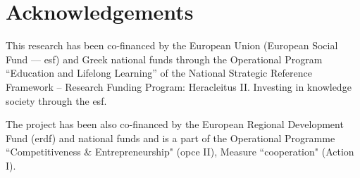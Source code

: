 \documentclass[conference]{llncs}
\begin{document}
\section*{Acknowledgements}

This research has been co-financed by the European Union (European Social Fund
--– {\sc esf}) and Greek national funds through the Operational Program
``Education and Lifelong Learning'' of the National Strategic Reference Framework –
Research Funding Program: Heracleitus II. Investing in knowledge society
through the {\sc esf}.

The project has been also co-financed by the European Regional Development Fund ({\sc erdf})
and national funds and is a part of the Operational Programme ``Competitiveness \&
Entrepreneurship" ({\sc opce} II), Measure ``{\sc cooperation}" (Action I).


 
\end{document}
